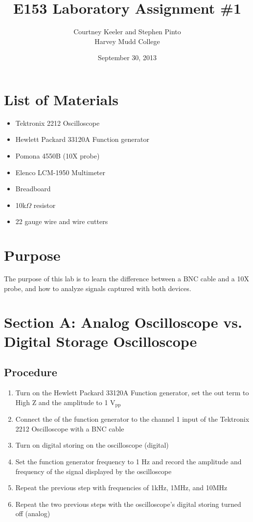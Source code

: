 \documentclass[12pt,letterpaper]{report}
\begin{document}
\title{E153 Laboratory Assignment \#1}
\author{Courtney Keeler and Stephen Pinto\\
Harvey Mudd College}
\date{September 30, 2013}
\maketitle

\section*{List of Materials}
\begin{itemize}
	\item Tektronix 2212 Oscilloscope
	\item Hewlett Packard 33120A Function generator
	\item Pomona 4550B (10X probe)
	\item Elenco LCM-1950 Multimeter
	\item Breadboard
	\item 10k$\Omega$ resistor
	\item 22 gauge wire and wire cutters
\end{itemize}

\section*{Purpose}
The purpose of this lab is to learn the difference between a BNC cable and a 10X probe, and how to analyze signals captured with both devices.

\section*{Section A: Analog Oscilloscope vs. Digital Storage Oscilloscope}
\subsection*{Procedure}
\begin{enumerate}
	\item Turn on the Hewlett Packard 33120A Function generator, set the out term to High Z and the amplitude to 1 $\text{V}_{\text{pp}}$
	\item Connect the of the function generator to the channel 1 input of the Tektronix 2212 Oscilloscope with a BNC cable
	\item Turn on digital storing on the oscilloscope (digital)
	\item Set the function generator frequency to 1 Hz and record the amplitude and frequency of the signal displayed by the oscilloscope
	\item Repeat the previous step with frequencies of 1kHz, 1MHz, and 10MHz
	\item Repeat the two previous steps with the oscilloscope's digital storing turned off (analog)
\end{enumerate}
\end{document}
